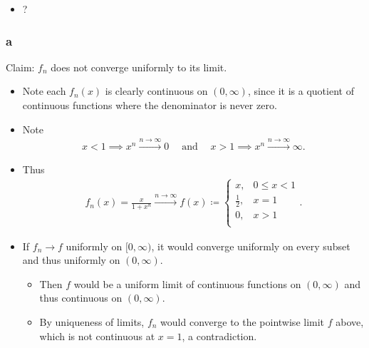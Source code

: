 
\begin{solution}

\hfill

\begin{concept}

\hfill

\begin{itemize}
\tightlist
\item
  ?
\end{itemize}

\end{concept}

\hypertarget{a-7}{%
\subsubsection{a}\label{a-7}}

Claim: \(f_n\) does not converge uniformly to its limit.

\begin{itemize}
\item
  Note each \(f_n(x)\) is clearly continuous on \((0, \infty)\), since
  it is a quotient of continuous functions where the denominator is
  never zero.
\item
  Note
  \begin{align*}
  x < 1 \implies x^n \overset{n\to\infty}\to 0{\quad \operatorname{and} \quad} x>1 \implies x^n \overset{n\to\infty}\to \infty
  .\end{align*}
\item
  Thus
  \begin{align*}
  f_n(x) = \frac{x}{1+ x^n}\overset{n\to\infty}\longrightarrow
  f(x) \coloneqq
  \begin{cases}
  x, & 0 \leq x < 1 \\
  \frac 1 2, & x = 1 \\
  0, & x > 1 \\
  \end{cases}
  .\end{align*}
\item
  If \(f_n \to f\) uniformly on \([0, \infty)\), it would converge
  uniformly on every subset and thus uniformly on \((0, \infty)\).

  \begin{itemize}
  \tightlist
  \item
    Then \(f\) would be a uniform limit of continuous functions on
    \((0, \infty)\) and thus continuous on \((0, \infty)\).
  \item
    By uniqueness of limits, \(f_n\) would converge to the pointwise
    limit \(f\) above, which is not continuous at \(x=1\), a
    contradiction.
  \end{itemize}
\end{itemize}


\end{solution}
